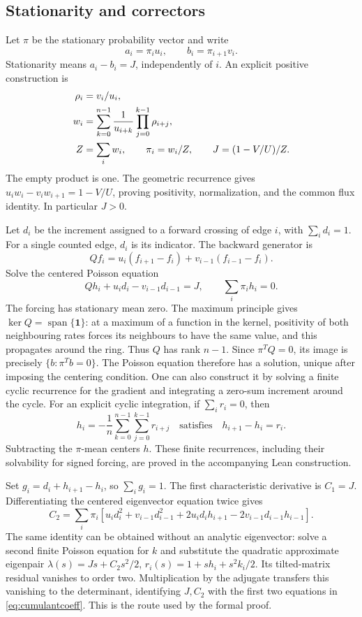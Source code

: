 \documentclass[11pt,a4paper]{article}
\numberwithin{equation}{section}
\theoremstyle{remark}
\begin{document}
\subsection{Stationarity and correctors}
Let $\pi$ be the stationary probability vector and write
\[
  a_i=\pi_i u_i,\qquad b_i=\pi_{i+1}v_i.
\]
Stationarity means $a_i-b_i=J$, independently of $i$. An explicit positive
construction is
\begin{align}
 \rho_i&=v_i/u_i,\notag\\
 w_i&=\sum_{k=0}^{n-1}\frac1{u_{i+k}}
                 \prod_{j=0}^{k-1}\rho_{i+j},\label{eq:stationary}\\
 Z&=\sum_iw_i,\qquad \pi_i=w_i/Z,\qquad J=(1-V/U)/Z.\notag
\end{align}
The empty product is one. The geometric recurrence gives
$u_iw_i-v_iw_{i+1}=1-V/U$, proving positivity, normalization, and the
common flux identity. In particular $J>0$.

Let $d_i$ be the increment assigned to a forward crossing of edge $i$,
with $\sum_i d_i=1$. For a single counted edge, $d_i$ is its indicator.
The backward generator is
\[
  Qf_i=u_i(f_{i+1}-f_i)+v_{i-1}(f_{i-1}-f_i).
\]
Solve the centered Poisson equation
\begin{equation}\label{eq:poisson}
  Qh_i+u_id_i-v_{i-1}d_{i-1}=J,
  \qquad \sum_i\pi_i h_i=0.
\end{equation}
The forcing has stationary mean zero. The maximum principle gives
$\ker Q=\operatorname{span}\{\mathbf1\}$: at a maximum of a function in
the kernel, positivity of both neighbouring rates forces its neighbours
to have the same value, and this propagates around the ring. Thus $Q$ has
rank $n-1$. Since $\pi^TQ=0$, its image is precisely
$\{b:\pi^Tb=0\}$. The Poisson equation therefore has a solution, unique
after imposing the centering condition. One can also construct it by
solving a finite cyclic recurrence for the gradient and integrating a
zero-sum increment around the cycle. For an explicit cyclic integration,
if $\sum_i r_i=0$, then
\[
  h_i=-\frac1n\sum_{k=0}^{n-1}\sum_{j=0}^{k-1}r_{i+j}
  \quad\text{satisfies}\quad h_{i+1}-h_i=r_i.
\]
Subtracting the $\pi$-mean centers $h$. These finite recurrences, including
their solvability for signed forcing, are proved in the accompanying Lean
construction.

Set $g_i=d_i+h_{i+1}-h_i$, so $\sum_i g_i=1$. The first characteristic
derivative is $C_1=J$. Differentiating the centered eigenvector equation
twice gives
\begin{equation}\label{eq:C2raw}
 C_2=\sum_i\pi_i\left[u_id_i^2+v_{i-1}d_{i-1}^2
       +2u_id_i h_{i+1}-2v_{i-1}d_{i-1}h_{i-1}\right].
\end{equation}
The same identity can be obtained without an analytic eigenvector: solve
a second finite Poisson equation for $k$ and substitute the quadratic
approximate eigenpair
$\lambda(s)=Js+C_2s^2/2$, $r_i(s)=1+sh_i+s^2k_i/2$.
Its tilted-matrix residual vanishes to order two. Multiplication by the
adjugate transfers this vanishing to the determinant, identifying $J,C_2$
with the first two equations in \eqref{eq:cumulantcoeff}. This is the route
used by the formal proof.
\end{document}
